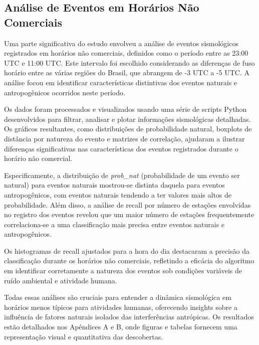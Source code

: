 \subsection{Análise de Eventos em Horários Não Comerciais}
\label{subsec:nao_comerciais}


\par{Uma parte significativa do estudo envolveu a análise de eventos sismológicos registrados em horários não comerciais, definidos como o período entre as 23:00 UTC e 11:00 UTC. Este intervalo foi escolhido considerando as diferenças de fuso horário entre as várias regiões do Brasil, que abrangem de -3 UTC a -5 UTC. A análise focou em identificar características distintivas dos eventos naturais e antropogênicos ocorridos neste período.}

\par{Os dados foram processados e visualizados usando uma série de scripts Python desenvolvidos para filtrar, analisar e plotar informações sismológicas detalhadas. Os gráficos resultantes, como distribuições de probabilidade natural, boxplots de distância por natureza do evento e matrizes de correlação, ajudaram a ilustrar diferenças significativas nas características dos eventos registrados durante o horário não comercial.}

\par{Especificamente, a distribuição de \textit{prob\_nat} (probabilidade de um evento ser natural) para eventos naturais mostrou-se distinta daquela para eventos antropogênicos, com eventos naturais tendendo a ter valores mais altos de probabilidade. Além disso, a análise de recall por número de estações envolvidas no registro dos eventos revelou que um maior número de estações frequentemente correlaciona-se a uma classificação mais precisa entre eventos naturais e antropogênicos.}

\par{Os histogramas de recall ajustados para a hora do dia destacaram a precisão da classificação durante os horários não comerciais, refletindo a eficácia do algoritmo em identificar corretamente a natureza dos eventos sob condições variáveis de ruído ambiental e atividade humana.}

\par{Todas essas análises são cruciais para entender a dinâmica sismológica em horários menos típicos para atividades humanas, oferecendo insights sobre a influência de fatores naturais isolados das interferências antrópicas. Os resultados estão detalhados nos Apêndices A e B, onde figuras e tabelas fornecem uma representação visual e quantitativa das descobertas.}

